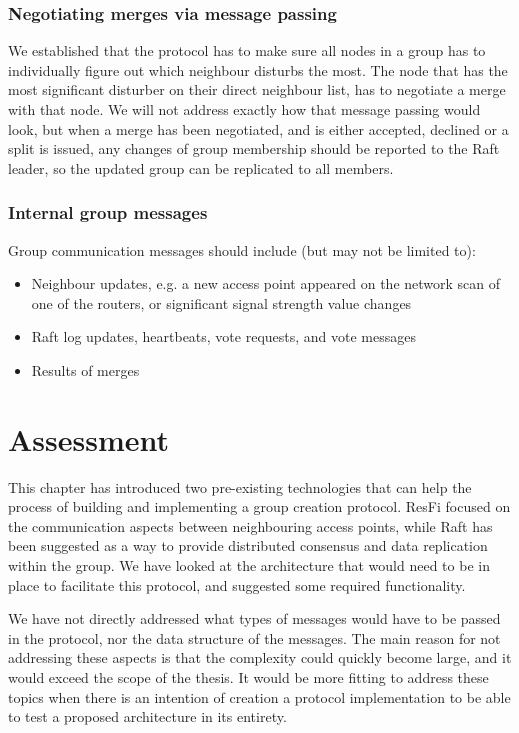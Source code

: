 \subsubsection{Negotiating merges via message passing}
We established that the protocol has to make sure all nodes in a group has to individually figure out which neighbour disturbs the most.
The node that has the most significant disturber on their direct neighbour list, has to negotiate a merge with that node. 
We will not address exactly how that message passing would look, but when a merge has been negotiated, and is either accepted, declined or a split is issued,
any changes of group membership should be reported to the Raft leader, so the updated group can be replicated to all members. 

\subsubsection{Internal group messages}
Group communication messages should include (but may not be limited to):
			\begin{itemize}
				\item Neighbour updates, e.g. a new access point appeared on the network scan of one of the routers, or significant signal strength value changes
				\item Raft log updates, heartbeats, vote requests, and vote messages
				\item Results of merges 
			\end{itemize}
				
\section{Assessment}
This chapter has introduced two pre-existing technologies that can help the process of building and implementing a group creation protocol. ResFi focused on the communication aspects between
neighbouring access points, while Raft has been suggested as a way to provide distributed consensus and data replication within the group. We have looked at the architecture that
would need to be in place to facilitate this protocol, and suggested some required functionality. 

We have not directly addressed what types of messages would have to be passed in the protocol, nor the data structure of the messages. The main reason for not addressing these aspects is 
that the complexity could quickly become large, and it would exceed the scope of the thesis. It would be more fitting to address these topics when there is an intention of creation
a protocol implementation to be able to test a proposed architecture in its entirety.  

